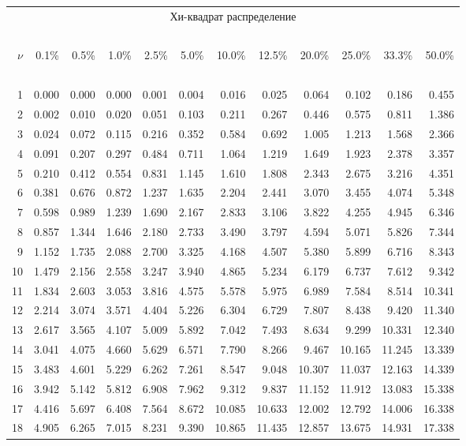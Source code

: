 {\begin{center}
\begin{tabular}{rr@{\ }r@{\ }r@{\ }r@{\ }r@{\ }r@{\ }r@{\ }r@{\ }r@{\ }r@{\ }r}
\end{tabular}
\end{center}


\newpage

\begin{center}
\begin{tabular}
      {r@{\ }r@{\ }r@{\ }r@{\ }r@{\ }r@{\ }r@{\ }r@{\ }r@{\ }r@{\ }r@{\ }r}
\multicolumn{12}{c}{Хи-квадрат распределение}\\
\ \\
$\nu$&0.1\%&0.5\%&1.0\%&2.5\%&5.0\%&10.0\%&12.5\%&20.0\%&25.0\%&33.3\%&50.0\%\\
\ \\
 1&0.000&0.000&0.000&0.001&0.004&0.016&0.025&0.064&0.102&0.186&0.455\\
 2&0.002&0.010&0.020&0.051&0.103&0.211&0.267&0.446&0.575&0.811&1.386\\
 3&0.024&0.072&0.115&0.216&0.352&0.584&0.692&1.005&1.213&1.568&2.366\\
 4&0.091&0.207&0.297&0.484&0.711&1.064&1.219&1.649&1.923&2.378&3.357\\
 5&0.210&0.412&0.554&0.831&1.145&1.610&1.808&2.343&2.675&3.216&4.351\\
 6&0.381&0.676&0.872&1.237&1.635&2.204&2.441&3.070&3.455&4.074&5.348\\
 7&0.598&0.989&1.239&1.690&2.167&2.833&3.106&3.822&4.255&4.945&6.346\\
 8&0.857&1.344&1.646&2.180&2.733&3.490&3.797&4.594&5.071&5.826&7.344\\
 9&1.152&1.735&2.088&2.700&3.325&4.168&4.507&5.380&5.899&6.716&8.343\\
10&1.479&2.156&2.558&3.247&3.940&4.865&5.234&6.179&6.737&7.612&9.342\\
11&1.834&2.603&3.053&3.816&4.575&5.578&5.975&6.989&7.584&8.514&10.341\\
12&2.214&3.074&3.571&4.404&5.226&6.304&6.729&7.807&8.438&9.420&11.340\\
13&2.617&3.565&4.107&5.009&5.892&7.042&7.493&8.634&9.299&10.331&12.340\\
14&3.041&4.075&4.660&5.629&6.571&7.790&8.266&9.467&10.165&11.245&13.339\\
15&3.483&4.601&5.229&6.262&7.261&8.547&9.048&10.307&11.037&12.163&14.339\\
16&3.942&5.142&5.812&6.908&7.962&9.312&9.837&11.152&11.912&13.083&15.338\\
17&4.416&5.697&6.408&7.564&8.672&10.085&10.633&12.002&12.792&14.006&16.338\\
18&4.905&6.265&7.015&8.231&9.390&10.865&11.435&12.857&13.675&14.931&17.338\\

\end{tabular}
\end{center}}

